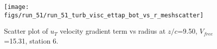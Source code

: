 \begin{figure}[H]
\centering
\texttt{[image: figs/run\_51/run\_51\_turb\_visc\_ettap\_bot\_vs\_r\_meshscatter]}
\caption{Scatter plot of $
u_T$ velocity gradient term vs radius at $z/c$=9.50, $V_{free}$=15.31, station 6.}
\end{figure}


